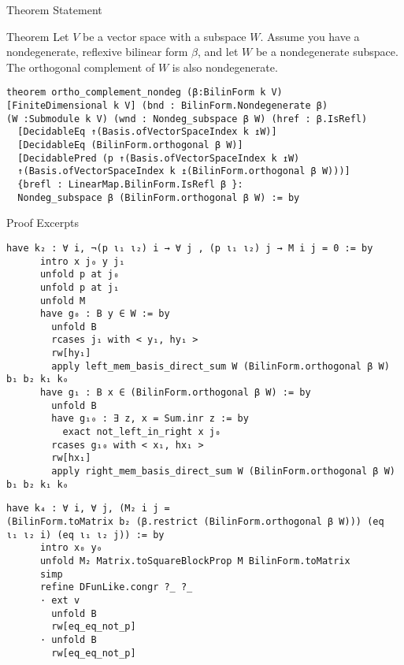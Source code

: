 \documentclass[svgnames]{beamer}
\begin{document}
\begin{frame}[label={sec:o},fragile]{Theorem Statement}


\begin{block}{Theorem}
Let $V$ be a vector space with a subspace $W$. Assume you have a nondegenerate, reflexive bilinear form $\beta$, and let $W$ be a nondegenerate subspace. The orthogonal complement of $W$ is also nondegenerate.
\end{block}

{\scriptsize
\begin{verbatim}
theorem ortho_complement_nondeg (β:BilinForm k V) 
[FiniteDimensional k V] (bnd : BilinForm.Nondegenerate β) 
(W :Submodule k V) (wnd : Nondeg_subspace β W) (href : β.IsRefl)
  [DecidableEq ↑(Basis.ofVectorSpaceIndex k ↥W)] 
  [DecidableEq (BilinForm.orthogonal β W)]
  [DecidablePred (p ↑(Basis.ofVectorSpaceIndex k ↥W)
  ↑(Basis.ofVectorSpaceIndex k ↥(BilinForm.orthogonal β W)))]
  {brefl : LinearMap.BilinForm.IsRefl β }:
  Nondeg_subspace β (BilinForm.orthogonal β W) := by
\end{verbatim}
}
\end{frame}

\begin{frame}[label={sec:o},fragile]{Proof Excerpts}

{\tiny
\begin{verbatim}
have k₂ : ∀ i, ¬(p ι₁ ι₂) i → ∀ j , (p ι₁ ι₂) j → M i j = 0 := by
      intro x j₀ y j₁
      unfold p at j₀
      unfold p at j₁
      unfold M
      have g₀ : B y ∈ W := by
        unfold B
        rcases j₁ with < y₁, hy₁ >
        rw[hy₁]
        apply left_mem_basis_direct_sum W (BilinForm.orthogonal β W) b₁ b₂ k₁ k₀
      have g₁ : B x ∈ (BilinForm.orthogonal β W) := by
        unfold B
        have g₁₀ : ∃ z, x = Sum.inr z := by
          exact not_left_in_right x j₀
        rcases g₁₀ with < x₁, hx₁ >
        rw[hx₁]
        apply right_mem_basis_direct_sum W (BilinForm.orthogonal β W) b₁ b₂ k₁ k₀
\end{verbatim}

\begin{verbatim}
have k₄ : ∀ i, ∀ j, (M₂ i j = 
(BilinForm.toMatrix b₂ (β.restrict (BilinForm.orthogonal β W))) (eq  ι₁ ι₂ i) (eq ι₁ ι₂ j)) := by
      intro x₀ y₀
      unfold M₂ Matrix.toSquareBlockProp M BilinForm.toMatrix
      simp
      refine DFunLike.congr ?_ ?_
      · ext v
        unfold B
        rw[eq_eq_not_p]
      · unfold B
        rw[eq_eq_not_p]
\end{verbatim}
}

\end{frame}
\end{document}
